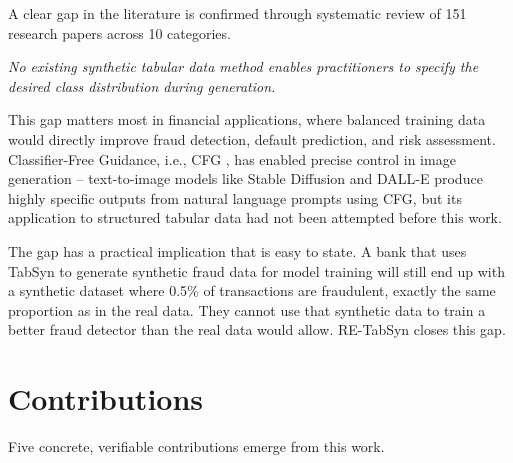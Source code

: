 A clear gap in the literature is confirmed through systematic review of 151 research papers across 10 categories.

\textit{No existing synthetic tabular data method enables practitioners to specify the desired class distribution during generation.}

This gap matters most in financial applications, where balanced training data would directly improve fraud detection, default prediction, and risk assessment. Classifier-Free Guidance, i.e., CFG \cite{ho2022cfg}, has enabled precise control in image generation -- text-to-image models like Stable Diffusion \cite{rombach2022ldm} and DALL-E produce highly specific outputs from natural language prompts using CFG, but its application to structured tabular data had not been attempted before this work.

The gap has a practical implication that is easy to state. A bank that uses TabSyn to generate synthetic fraud data for model training will still end up with a synthetic dataset where 0.5\% of transactions are fraudulent, exactly the same proportion as in the real data. They cannot use that synthetic data to train a better fraud detector than the real data would allow. RE-TabSyn closes this gap.

\section{Contributions}

Five concrete, verifiable contributions emerge from this work.

